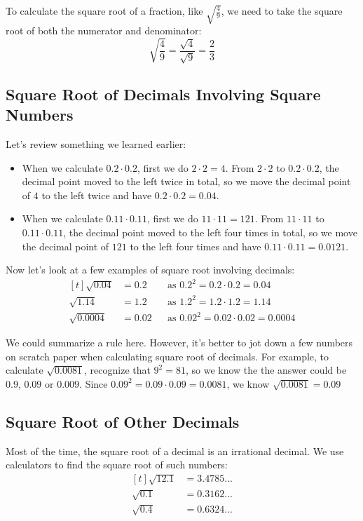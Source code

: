To calculate the square root of a fraction, like $\sqrt{\frac{4}{9}}$, we need to take the square root of both the numerator and denominator:
\[ \sqrt{\frac{4}{9}} = \frac{\sqrt{4}}{\sqrt{9}} = \frac{2}{3} \]

\subsection{Square Root of Decimals Involving Square Numbers}
Let's review something we learned earlier:
\begin{itemize}
\item When we calculate $0.2\cdot0.2$, first we do $2\cdot2=4$. From $2\cdot2$ to $0.2\cdot0.2$, the decimal point moved to the left twice in total, so we move the decimal point of $4$ to the left twice and have $0.2\cdot0.2=0.04$.
\item When we calculate $0.11\cdot0.11$, first we do $11\cdot11=121$. From $11\cdot11$ to $0.11\cdot0.11$, the decimal point moved to the left four times in total, so we move the decimal point of $121$ to the left four times and have $0.11\cdot0.11=0.0121$.
\end{itemize}

Now let's look at a few examples of square root involving decimals:
\[
\begin{aligned}[t]
	\sqrt{0.04} &= 0.2 && \text{as } 0.2^{2}=0.2 \cdot 0.2=0.04 \\
	\sqrt{1.14} &= 1.2 && \text{as } 1.2^{2}=1.2 \cdot 1.2=1.14 \\
	\sqrt{0.0004} &= 0.02 && \text{as } 0.02^{2}=0.02 \cdot 0.02=0.0004
\end{aligned}
\]

We could summarize a rule here. However, it's better to jot down a few numbers on scratch paper when calculating square root of decimals. For example, to calculate $\sqrt{0.0081}$, recognize that $9^{2}=81$, so we know the the answer could be $0.9$, $0.09$ or $0.009$. Since $0.09^{2}=0.09\cdot0.09=0.0081$, we know $\sqrt{0.0081}=0.09$

\subsection{Square Root of Other Decimals}
Most of the time, the square root of a decimal is an irrational decimal. We use calculators to find the square root of such numbers:
\[
\begin{aligned}[t]
	\sqrt{12.1} &= 3.4785...\\
	\sqrt{0.1} &= 0.3162...\\
	\sqrt{0.4} &= 0.6324...
\end{aligned}
\]


